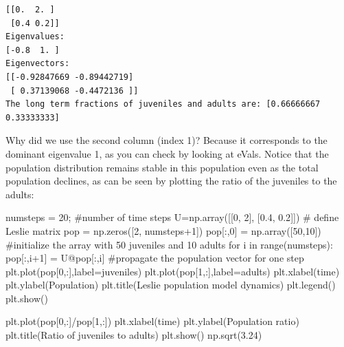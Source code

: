 \documentclass[
  letterpaper,
  DIV=11,
  numbers=noendperiod]{scrreprt}
\newenvironment{Shaded}{\begin{snugshade}}{\end{snugshade}}
\newcommand{\BuiltInTok}[1]{\textcolor[rgb]{0.00,0.23,0.31}{#1}}
\newcommand{\CommentTok}[1]{\textcolor[rgb]{0.37,0.37,0.37}{#1}}
\newcommand{\ControlFlowTok}[1]{\textcolor[rgb]{0.00,0.23,0.31}{#1}}
\newcommand{\DecValTok}[1]{\textcolor[rgb]{0.68,0.00,0.00}{#1}}
\newcommand{\FloatTok}[1]{\textcolor[rgb]{0.68,0.00,0.00}{#1}}
\newcommand{\KeywordTok}[1]{\textcolor[rgb]{0.00,0.23,0.31}{#1}}
\newcommand{\NormalTok}[1]{\textcolor[rgb]{0.00,0.23,0.31}{#1}}
\newcommand{\OperatorTok}[1]{\textcolor[rgb]{0.37,0.37,0.37}{#1}}
\newcommand{\StringTok}[1]{\textcolor[rgb]{0.13,0.47,0.30}{#1}}
\begin{document}
\begin{verbatim}
[[0.  2. ]
 [0.4 0.2]]
Eigenvalues:
[-0.8  1. ]
Eigenvectors:
[[-0.92847669 -0.89442719]
 [ 0.37139068 -0.4472136 ]]
The long term fractions of juveniles and adults are: [0.66666667 0.33333333]
\end{verbatim}

Why did we use the second column (index 1)? Because it corresponds to
the dominant eigenvalue 1, as you can check by looking at eVals. Notice
that the population distribution remains stable in this population even
as the total population declines, as can be seen by plotting the ratio
of the juveniles to the adults:

\begin{Shaded}
\begin{Highlighting}[]
\NormalTok{numsteps }\OperatorTok{=} \DecValTok{20}\OperatorTok{;} \CommentTok{\#number of time steps}
\NormalTok{U}\OperatorTok{=}\NormalTok{np.array([[}\DecValTok{0}\NormalTok{, }\DecValTok{2}\NormalTok{], [}\FloatTok{0.4}\NormalTok{, }\FloatTok{0.2}\NormalTok{]]) }\CommentTok{\# define Leslie matrix}
\NormalTok{pop }\OperatorTok{=}\NormalTok{ np.zeros([}\DecValTok{2}\NormalTok{, numsteps}\OperatorTok{+}\DecValTok{1}\NormalTok{])}
\NormalTok{pop[:,}\DecValTok{0}\NormalTok{] }\OperatorTok{=}\NormalTok{ np.array([}\DecValTok{50}\NormalTok{,}\DecValTok{10}\NormalTok{]) }\CommentTok{\#initialize the array with 50 juveniles and 10 adults}
\ControlFlowTok{for}\NormalTok{ i }\KeywordTok{in} \BuiltInTok{range}\NormalTok{(numsteps):}
\NormalTok{    pop[:,i}\OperatorTok{+}\DecValTok{1}\NormalTok{] }\OperatorTok{=}\NormalTok{ U}\OperatorTok{@}\NormalTok{pop[:,i] }\CommentTok{\#propagate the population vector for one step}
\NormalTok{plt.plot(pop[}\DecValTok{0}\NormalTok{,:],label}\OperatorTok{=}\StringTok{\textquotesingle{}juveniles\textquotesingle{}}\NormalTok{)}
\NormalTok{plt.plot(pop[}\DecValTok{1}\NormalTok{,:],label}\OperatorTok{=}\StringTok{\textquotesingle{}adults\textquotesingle{}}\NormalTok{) }
\NormalTok{plt.xlabel(}\StringTok{\textquotesingle{}time\textquotesingle{}}\NormalTok{)}
\NormalTok{plt.ylabel(}\StringTok{\textquotesingle{}Population\textquotesingle{}}\NormalTok{)}
\NormalTok{plt.title(}\StringTok{\textquotesingle{}Leslie population model dynamics\textquotesingle{}}\NormalTok{)}
\NormalTok{plt.legend()}
\NormalTok{plt.show()}

\NormalTok{plt.plot(pop[}\DecValTok{0}\NormalTok{,:]}\OperatorTok{/}\NormalTok{pop[}\DecValTok{1}\NormalTok{,:])}
\NormalTok{plt.xlabel(}\StringTok{\textquotesingle{}time\textquotesingle{}}\NormalTok{)}
\NormalTok{plt.ylabel(}\StringTok{\textquotesingle{}Population ratio\textquotesingle{}}\NormalTok{)}
\NormalTok{plt.title(}\StringTok{\textquotesingle{}Ratio of juveniles to adults\textquotesingle{}}\NormalTok{)}
\NormalTok{plt.show()}
\NormalTok{np.sqrt(}\FloatTok{3.24}\NormalTok{)}
\end{Highlighting}
\end{Shaded}
\end{document}
